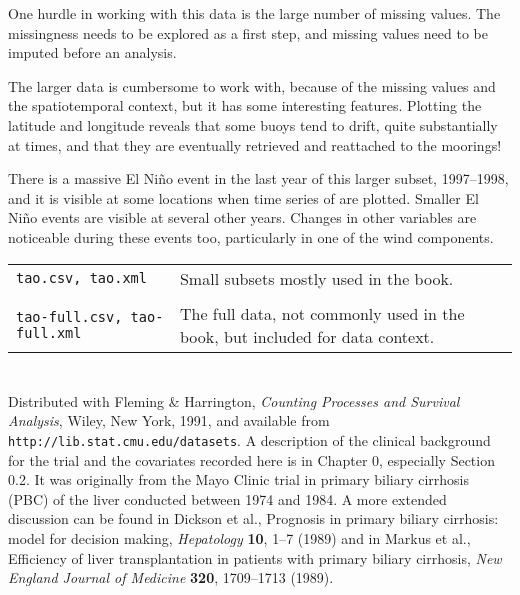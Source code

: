 \bigskip
{} One hurdle in working with this data is
the large number of missing values. The missingness needs to be
explored as a first step, and missing values need to be imputed before
an analysis.

The larger data is cumbersome to work with, because of the missing
values and the spatiotemporal context, but it has some interesting
features. Plotting the latitude and longitude reveals that some buoys
tend to drift, quite substantially at times, and that they are
eventually retrieved and reattached to the moorings!

There is a massive El Ni\~no event in the last year of this larger
subset, 1997--1998, and it is visible at some locations when time series
of  are plotted. Smaller El Ni\~no events
are visible at several other years. Changes in other variables are
noticeable during these events too, particularly in one of the wind
components.

\bigskip
{}

\smallskip 
\begin{tabular}{p{1.3in}p{3in}}
{\tt tao.csv, tao.xml} & Small subsets mostly used in the book.\\
\\
{\tt tao-full.csv, tao-full.xml} & The full data, 
not commonly used in the book, but included for data context.
\end{tabular}

\section{}

 Distributed with Fleming \& Harrington, {\em
Counting Processes and Survival Analysis}, Wiley, New York, 1991, and
available from \\{\tt http://lib.stat.cmu.edu/datasets}. A description
of the clinical background for the trial and the covariates recorded
here is in Chapter 0, especially Section 0.2.  It was originally from
the Mayo Clinic trial in primary biliary cirrhosis (PBC) of the liver
conducted between 1974 and 1984.  A more extended discussion can be
found in Dickson et al., Prognosis in primary biliary cirrhosis:
model for decision making, {\em Hepatology} {\bf 10}, 1--7 (1989)
and in Markus et al., Efficiency of liver transplantation in
patients with primary biliary cirrhosis, {\em New England Journal of
Medicine} {\bf 320}, 1709--1713
(1989). \nocite{statlib,FH91,DGFFL1989,MDGF1989}


